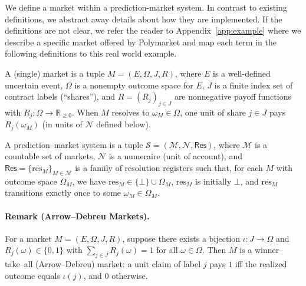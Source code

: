 
We define a market within a prediction-market system. In contrast to existing definitions, we abstract away details about how they are implemented. If the definitions are not clear, we refer the reader to Appendix~\ref{app:example} where we describe a specific market offered by Polymarket and map each term in the following definitions to this real world example.

\begin{definition}[Market]\label{def:market}
A (single) market is a tuple $M=(E,\Omega,J,R)$, where $E$ is a well-defined uncertain event, $\Omega$ is a nonempty outcome space for $E$, $J$ is a finite index set of contract labels (“shares”), and $R=(R_j)_{j\in J}$ are nonnegative payoff functions with $R_j:\Omega\to\mathbb{R}_{\ge 0}$. When $M$ resolves to $\omega_M\in\Omega$, one unit of share $j\in J$ pays $R_j(\omega_M)$ (in units of $\mathcal{N}$ defined below).
\end{definition}

\begin{definition}\label{def:system}
A prediction--market system is a tuple $\mathcal{S}=(\mathcal{M},\mathcal{N},\mathsf{Res})$, where $\mathcal{M}$ is a countable set of markets, $\mathcal{N}$ is a numeraire (unit of account), and $\mathsf{Res}=\{\mathrm{res}_M\}_{M\in\mathcal{M}}$ is a family of resolution registers such that, for each $M$ with outcome space $\Omega_M$, we have $\mathrm{res}_M\in\{\bot\}\cup\Omega_M$, $\mathrm{res}_M$ is initially $\bot$, and $\mathrm{res}_M$ transitions exactly once to some $\omega_M\in\Omega_M$.
\end{definition}


\paragraph{Remark (Arrow--Debreu Markets).}
For a market $M=(E,\Omega,J,R)$, suppose there exists a bijection $\iota:J\to\Omega$ and
$R_j(\omega)\in\{0,1\}$ with $\sum_{j\in J} R_j(\omega)=1$ for all $\omega\in\Omega$.
Then $M$ is a winner--take--all (Arrow--Debreu) market: a unit claim of label $j$ pays $1$ iff the realized outcome equals $\iota(j)$, and $0$ otherwise.

